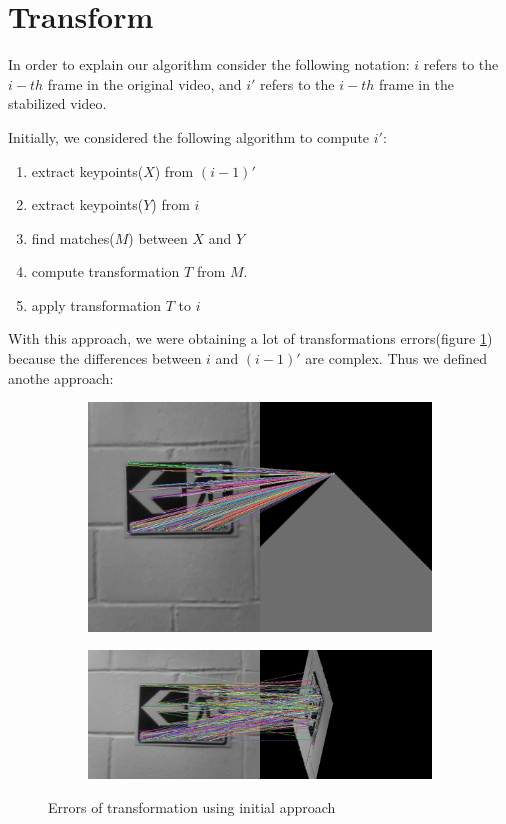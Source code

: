 \section{Transform}

In order to explain our algorithm consider the following notation: $i$ refers to the $i-th$ frame in the original video, and $i'$ refers to the $i-th$ frame in the stabilized video.

Initially, we considered the following algorithm to compute $i'$:
\begin{enumerate}
	\item extract keypoints($X$) from $(i-1)'$
	\item extract keypoints($Y$) from $i$
	\item find matches($M$) between $X$ and $Y$
	\item compute transformation $T$ from $M$.
	\item apply transformation $T$ to $i$
\end{enumerate}

With this approach, we were obtaining a lot of transformations errors(figure \ref{fig:misstransformations}) because the differences between $i$ and $(i-1)'$ are complex. Thus we defined anothe approach:   

\begin{figure}[!h]
	\centering
	\begin{subfigure}{0.5\textwidth}
	  \centering
	  \includegraphics[width=0.8\linewidth]{figs/mistrans01.jpg}
	\end{subfigure}%
	\begin{subfigure}{0.5\textwidth}
	  \centering
	  \includegraphics[width=0.8\linewidth]{figs/mistrans02.jpg}
	\end{subfigure}%
	 \caption{Errors of transformation using initial approach}
	\label{fig:misstransformations}
\end{figure}

